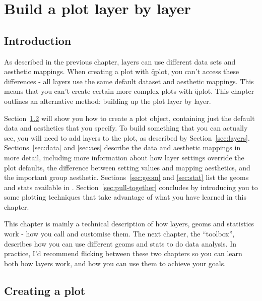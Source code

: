 

% 


\chapter{Build a plot layer by layer}
\label{cha:layers}

\section{Introduction}

As described in the previous chapter, layers can use different data sets and aesthetic mappings.  When creating a plot with \f{qplot}, you can't access these differences - all layers use the same default dataset and aesthetic mappings.  This means that you can't create certain more complex plots with \f{qplot}.  This chapter outlines an alternative method: building up the plot layer by layer.  

Section~\ref{sec:ggplot} will show you how to create a plot object, containing just the default data and aesthetics that you specify.  To build something that you can actually see, you will need to add layers to the plot, as described by Section~\ref{sec:layers}.  Sections~\ref{sec:data} and \ref{sec:aes} describe the data and aesthetic mappings in more detail, including more information about how layer settings override the plot defaults, the difference between setting values and mapping aesthetics, and the important group aesthetic.  Sections~\ref{sec:geom} and \ref{sec:stat} list the geoms and stats available in \ggplot.   Section~\ref{sec:pull-together} concludes by introducing you to some plotting techniques that take advantage of what you have learned in this chapter.

This chapter is mainly a technical description of how layers, geoms and statistics work - how you call and customise them.  The next chapter, the \ggplot ``toolbox'', describes how you can use different geoms and stats to do data analysis.  In practice, I'd recommend flicking between these two chapters so you can learn both how layers work, and how you can use them to achieve your goals.

\section{Creating a plot}
\label{sec:ggplot}

